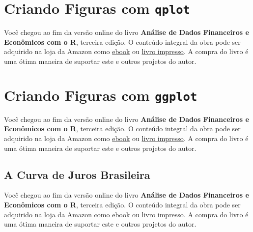 \documentclass[
  11pt,
]{book}
\newenvironment{pleasebuyit}
{\begin{noteblock}
		
	} {\end{noteblock}}
\begin{document}
\hypertarget{criando-figuras-com-qplot}{%
\section{\texorpdfstring{Criando Figuras com \texttt{qplot}}{Criando Figuras com qplot}}\label{criando-figuras-com-qplot}}

\begin{pleasebuyit}
Você chegou ao fim da versão online do livro \textbf{Análise de Dados
Financeiros e Econômicos com o R}, terceira edição. O conteúdo integral
da obra pode ser adquirido na loja da Amazon como
\href{https://www.amazon.com.br/dp/B08WNC27ZY}{ebook} ou
\href{https://www.amazon.com/dp/B08WP8CCDB}{livro impresso}. A compra do
livro é uma ótima maneira de suportar este e outros projetos do autor.
\end{pleasebuyit}

\hypertarget{criando-figuras-com-ggplot}{%
\section{\texorpdfstring{Criando Figuras com \texttt{ggplot}}{Criando Figuras com ggplot}}\label{criando-figuras-com-ggplot}}

\begin{pleasebuyit}
Você chegou ao fim da versão online do livro \textbf{Análise de Dados
Financeiros e Econômicos com o R}, terceira edição. O conteúdo integral
da obra pode ser adquirido na loja da Amazon como
\href{https://www.amazon.com.br/dp/B08WNC27ZY}{ebook} ou
\href{https://www.amazon.com/dp/B08WP8CCDB}{livro impresso}. A compra do
livro é uma ótima maneira de suportar este e outros projetos do autor.
\end{pleasebuyit}

\hypertarget{a-curva-de-juros-brasileira}{%
\subsection{A Curva de Juros Brasileira}\label{a-curva-de-juros-brasileira}}

\begin{pleasebuyit}
Você chegou ao fim da versão online do livro \textbf{Análise de Dados
Financeiros e Econômicos com o R}, terceira edição. O conteúdo integral
da obra pode ser adquirido na loja da Amazon como
\href{https://www.amazon.com.br/dp/B08WNC27ZY}{ebook} ou
\href{https://www.amazon.com/dp/B08WP8CCDB}{livro impresso}. A compra do
livro é uma ótima maneira de suportar este e outros projetos do autor.
\end{pleasebuyit}
\end{document}
